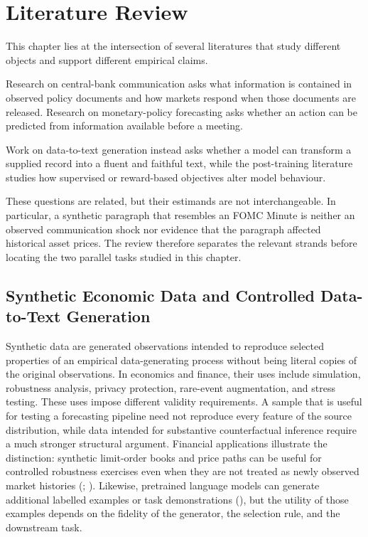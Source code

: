 
\section{Literature Review}\label{ch2:sec:lr}

This chapter lies at the intersection of several literatures that study different objects and support different empirical claims. 

Research on central-bank communication asks what information is contained in observed policy documents and how markets respond when those documents are released. Research on monetary-policy forecasting asks whether an action can be predicted from information available before a meeting. 

Work on data-to-text generation instead asks whether a model can transform a supplied record into a fluent and faithful text, while the post-training literature studies how supervised or reward-based objectives alter model behaviour. 

These questions are related, but their estimands are not interchangeable. In particular, a synthetic paragraph that resembles an FOMC Minute is neither an observed communication shock nor evidence that the paragraph affected historical asset prices. The review therefore separates the relevant strands before locating the two parallel tasks studied in this chapter.


\subsection{Synthetic Economic Data and Controlled Data-to-Text Generation}
\label{ch2:sec:lr:synthetic}

Synthetic data are generated observations intended to reproduce selected properties of an empirical data-generating process without being literal copies of the original observations. In economics and finance, their uses include simulation, robustness analysis, privacy protection, rare-event augmentation, and stress testing. These uses impose different validity requirements. A sample that is useful for testing a forecasting pipeline need not reproduce every feature of the source distribution, while data intended for substantive counterfactual inference require a much stronger structural argument. Financial applications illustrate the distinction: synthetic limit-order books and price paths can be useful for controlled robustness exercises even when they are not treated as newly observed market histories (\cite{cao2022synthetic}; \cite{carvajal2022synthetic}). Likewise, pretrained language models can generate additional labelled examples or task demonstrations (\cite{schick2021generating}), but the utility of those examples depends on the fidelity of the generator, the selection rule, and the downstream task.

